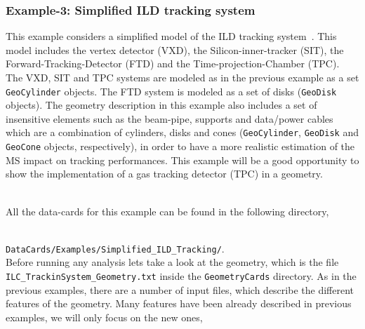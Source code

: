 \subsubsection{Example-3: Simplified ILD tracking system}
\label{subsubsec:Example3}

This example considers a simplified model of the ILD tracking system~\cite{bib:ILDcoll}. This model includes the vertex detector (VXD), the Silicon-inner-tracker (SIT), 
the Forward-Tracking-Detector (FTD) and the Time-projection-Chamber (TPC). The VXD, SIT and TPC systems are modeled as in the previous example as a set {\tt GeoCylinder} 
objects. The FTD system is modeled as a set of disks ({\tt GeoDisk} objects). The geometry description in this example also includes a set of insensitive elements such 
as the beam-pipe, supports and data/power cables which are a combination of cylinders, disks and cones ({\tt GeoCylinder}, {\tt GeoDisk} and {\tt GeoCone} objects, respectively), 
in order to have a more realistic estimation of the MS impact on tracking performances. This example will be a good opportunity to show the implementation of a gas tracking detector 
(TPC) in a geometry.

~\\
\noindent
All the data-cards for this example can be found in the following directory,

~\\
{\small {\tt DataCards/Examples/Simplified\_ILD\_Tracking/}}.
~\\

\noindent
Before running any analysis lets take a look at the geometry, which is the file {\tt ILC\_TrackinSystem\_Geometry.txt} inside the {\tt GeometryCards} directory.
As in the previous examples, there are a number of input files, which describe the different features of the geometry. Many features have been already described 
in previous examples, we will only focus on the new ones,

